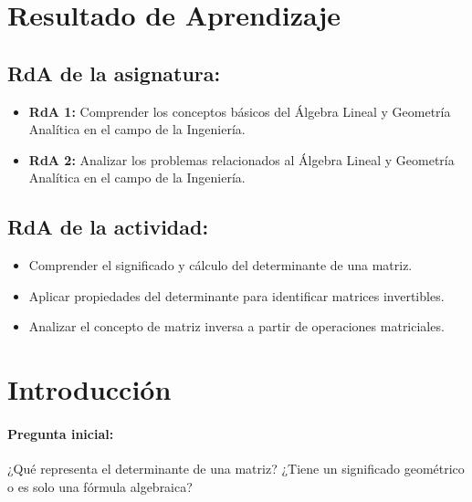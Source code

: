 \documentclass[a4,11pt]{aleph-notas}
\begin{document}
\encabezado


\section*{Resultado de Aprendizaje}

\subsection*{RdA de la asignatura:}
\begin{itemize}[leftmargin=*]
    \item \textbf{RdA 1:} Comprender los conceptos básicos del Álgebra Lineal y Geometría Analítica en el campo de la Ingeniería.
    \item \textbf{RdA 2:} Analizar los problemas relacionados al Álgebra Lineal y Geometría Analítica en el campo de la Ingeniería.
\end{itemize}

\subsection*{RdA de la actividad:}
\begin{itemize}[leftmargin=*]  
    \item Comprender el significado y cálculo del determinante de una matriz.  
    \item Aplicar propiedades del determinante para identificar matrices invertibles.  
    \item Analizar el concepto de matriz inversa a partir de operaciones matriciales.  
\end{itemize}  


\section*{Introducción}  

\paragraph{Pregunta inicial:}  
¿Qué representa el determinante de una matriz? ¿Tiene un significado geométrico o es solo una fórmula algebraica?  
\end{document}
